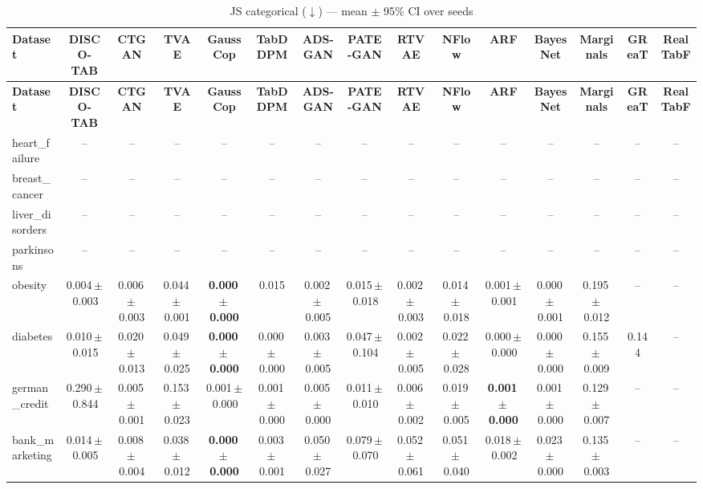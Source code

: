 \documentclass[8pt]{extarticle}
\begin{document}
\begin{longtable}{l*{14}{c}}
\caption{JS categorical ($\downarrow$) --- mean $\pm$ 95\% CI over seeds}\\
\toprule
\textbf{Dataset} & \textbf{DISCO-TAB} & \textbf{CTGAN} & \textbf{TVAE} & \textbf{GaussCop} & \textbf{TabDDPM} & \textbf{ADS-GAN} & \textbf{PATE-GAN} & \textbf{RTVAE} & \textbf{NFlow} & \textbf{ARF} & \textbf{BayesNet} & \textbf{Marginals} & \textbf{GReaT} & \textbf{RealTabF} \\
\midrule
\endfirsthead
\toprule
\textbf{Dataset} & \textbf{DISCO-TAB} & \textbf{CTGAN} & \textbf{TVAE} & \textbf{GaussCop} & \textbf{TabDDPM} & \textbf{ADS-GAN} & \textbf{PATE-GAN} & \textbf{RTVAE} & \textbf{NFlow} & \textbf{ARF} & \textbf{BayesNet} & \textbf{Marginals} & \textbf{GReaT} & \textbf{RealTabF} \\
\midrule
\endhead
\bottomrule
\endfoot
heart\_failure & -- & -- & -- & -- & -- & -- & -- & -- & -- & -- & -- & -- & -- & -- \\
breast\_cancer & -- & -- & -- & -- & -- & -- & -- & -- & -- & -- & -- & -- & -- & -- \\
liver\_disorders & -- & -- & -- & -- & -- & -- & -- & -- & -- & -- & -- & -- & -- & -- \\
parkinsons & -- & -- & -- & -- & -- & -- & -- & -- & -- & -- & -- & -- & -- & -- \\
obesity & 0.004\,$\pm$\,0.003 & 0.006\,$\pm$\,0.003 & 0.044\,$\pm$\,0.001 & \textbf{0.000\,$\pm$\,0.000} & 0.015 & 0.002\,$\pm$\,0.005 & 0.015\,$\pm$\,0.018 & 0.002\,$\pm$\,0.003 & 0.014\,$\pm$\,0.018 & 0.001\,$\pm$\,0.001 & 0.000\,$\pm$\,0.001 & 0.195\,$\pm$\,0.012 & -- & -- \\
diabetes & 0.010\,$\pm$\,0.015 & 0.020\,$\pm$\,0.013 & 0.049\,$\pm$\,0.025 & \textbf{0.000\,$\pm$\,0.000} & 0.000\,$\pm$\,0.000 & 0.003\,$\pm$\,0.005 & 0.047\,$\pm$\,0.104 & 0.002\,$\pm$\,0.005 & 0.022\,$\pm$\,0.028 & 0.000\,$\pm$\,0.000 & 0.000\,$\pm$\,0.000 & 0.155\,$\pm$\,0.009 & 0.144 & -- \\
german\_credit & 0.290\,$\pm$\,0.844 & 0.005\,$\pm$\,0.001 & 0.153\,$\pm$\,0.023 & 0.001\,$\pm$\,0.000 & 0.001\,$\pm$\,0.000 & 0.005\,$\pm$\,0.000 & 0.011\,$\pm$\,0.010 & 0.006\,$\pm$\,0.002 & 0.019\,$\pm$\,0.005 & \textbf{0.001\,$\pm$\,0.000} & 0.001\,$\pm$\,0.000 & 0.129\,$\pm$\,0.007 & -- & -- \\
bank\_marketing & 0.014\,$\pm$\,0.005 & 0.008\,$\pm$\,0.004 & 0.038\,$\pm$\,0.012 & \textbf{0.000\,$\pm$\,0.000} & 0.003\,$\pm$\,0.001 & 0.050\,$\pm$\,0.027 & 0.079\,$\pm$\,0.070 & 0.052\,$\pm$\,0.061 & 0.051\,$\pm$\,0.040 & 0.018\,$\pm$\,0.002 & 0.023\,$\pm$\,0.000 & 0.135\,$\pm$\,0.003 & -- & -- \\

\end{longtable}
\end{document}
